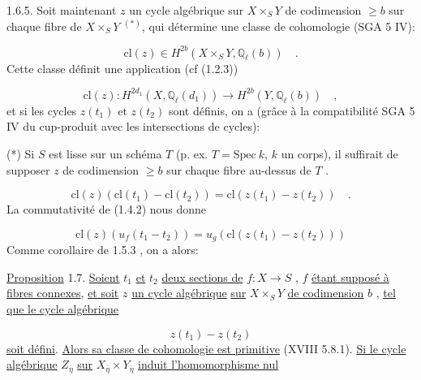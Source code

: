 1.6.5. Soit maintenant $z$ un cycle algébrique sur $X \times_S Y$ de codimension $\geq b$ sur chaque fibre de $X \times_S Y$ $^{(*)}$, qui détermine une classe de cohomologie (SGA 5 IV\hspace{2em}):

\begin{equation}\tag{1.6.6}
\mathrm{cl}(z) \in H^{2b}(X \times_S Y, \mathbb{Q}_\ell(b)) \quad .
\end{equation}
Cette classe définit une application (cf (1.2.3))

\begin{equation}\tag{1.6.7}
\mathrm{cl}(z) : H^{2d_1}(X, \mathbb{Q}_\ell(d_1)) \longrightarrow H^{2b}(Y, \mathbb{Q}_\ell(b)) \quad ,
\end{equation}
et si les cycles $z(t_1)$ et $z(t_2)$ sont définis, on a (grâce à la compatibilité SGA 5 IV\hspace{3em} du cup-produit avec les intersections de cycles):

(*) Si $S$ est lisse sur un schéma $T$ (p. ex. $T=\mathrm{Spec}\ k$, $k$ un corps), il suffirait de supposer $z$ de codimension $\geq b$ sur chaque fibre au-dessus de $T$ .



\begin{equation}\tag{1.6.8}
\mathrm{cl}(z) (\mathrm{cl}(t_1) - \mathrm{cl}(t_2)) = \mathrm{cl}(z(t_1) - z(t_2)) \quad .
\end{equation}
La commutativité de (1.4.2) nous donne

\begin{equation}\tag{1.6.9}
\mathrm{cl}(z) (u_f(t_1-t_2)) = u_g(\mathrm{cl}(z(t_1) - z(t_2)))
\end{equation}
Comme corollaire de 1.5.3 , on a alors:

\underline{Proposition} 1.7. \underline{Soient} $t_1$ \underline{et} $t_2$ \underline{deux sections de} $f : X \longrightarrow S$ , $f$ \underline{étant supposé à fibres connexes}, \underline{et soit} $z$ \underline{un cycle algébrique} \underline{sur} $X \times_S Y$ \underline{de codimension} $b$ , \underline{tel que le cycle algébrique}

\begin{equation}\tag{1.7.1}
z(t_1) - z(t_2)
\end{equation}
\underline{soit défini}. \underline{Alors sa classe de cohomologie est primitive} (XVIII 5.8.1). \underline{Si le cycle algébrique} $Z_{\overline{\eta}}$ \underline{sur} $X_{\overline{\eta}} \times Y_{\overline{\eta}}$ \underline{induit l'homomorphisme nul}

